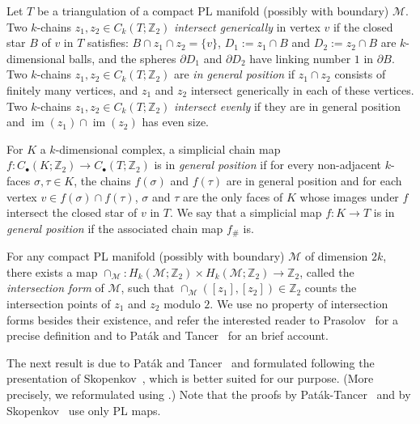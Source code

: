 \documentclass[a4paper,UKenglish,thm-restate]{article}
\newcommand{\Z}{\mathbb{Z}}
\newcommand{\M}{\mathcal{M}}
\DeclareMathOperator{\im}{im}
\newcommand{\defn}[1]{\emph{\color{violet}#1}}
\begin{document}
\medskip

Let $T$ be a triangulation of a compact PL manifold (possibly with boundary) $\M$. Two $k$-chains $z_1,z_2\in C_k(T;\Z_2)$ \defn{intersect generically} in vertex $v$ if the closed star $B$ of $v$ in $T$ satisfies: $B \cap z_1 \cap z_2 = \{v\}$, $D_1:= z_1 \cap B$ and $D_2:= z_2 \cap B$ are $k$-dimensional balls, and the spheres $\partial D_1$ and $\partial D_2$ have linking number $1$ in $\partial B$. Two $k$-chains $z_1,z_2\in C_k(T;\Z_2)$ are \defn{in general position} if $z_1 \cap z_2$ consists of finitely many vertices, and $z_1$ and $z_2$ intersect generically in each of these vertices. Two $k$-chains $z_1,z_2\in C_k(T;\Z_2)$ \defn{intersect evenly} if they are in general position and $\im(z_1)\cap \im(z_2)$ has even size.

\medskip

For $K$ a $k$-dimensional complex, a simplicial chain map $f:C_\bullet(K;\Z_2) \to C_\bullet(T;\Z_2)$ is in \defn{general position} if for every non-adjacent $k$-faces $\sigma, \tau \in K$, the chains $f(\sigma)$ and $f(\tau)$ are in general position and for each vertex $v \in f(\sigma) \cap f(\tau)$, $\sigma$ and $\tau$ are the only faces of $K$ whose images under $f$ intersect the closed star of $v$ in $T$. We say that a simplicial map $f:K \to T$ is  in \defn{general position} if the associated chain map $f_\#$ is.

\medskip

For any compact PL manifold (possibly with boundary) $\M$ of dimension $2k$, there exists a map $\cap_{\M}:H_k(\M;\Z_2)\times H_k(\M;\Z_2)\to\Z_2$, called the \defn{intersection form} of $\M$, such that $\cap_{\M}([z_1],[z_2])\in\Z_2$ counts the intersection points of $z_1$ and $z_2$ modulo $2$. We use no property of intersection forms besides their existence, and refer the interested reader to Prasolov~\cite[Chapter~2, $\S$2.7]{prasolov2007elements} for a precise definition and to Paták and Tancer~\cite{patak-tancer} for an brief account.


\medskip

The next result is due to Paták and Tancer~\cite[Proposition~21]{patak-tancer} and formulated following the presentation of Skopenkov~\cite{skopenkov}, which is better suited for our purpose. (More precisely, we reformulated \cite[Theorem~1.1.5]{skopenkov} using \cite[Lemma~2.1.1]{skopenkov}.) Note that the proofs by Paták-Tancer~\cite{patak-tancer} and by Skopenkov~\cite{skopenkov} use only PL maps.
\end{document}

